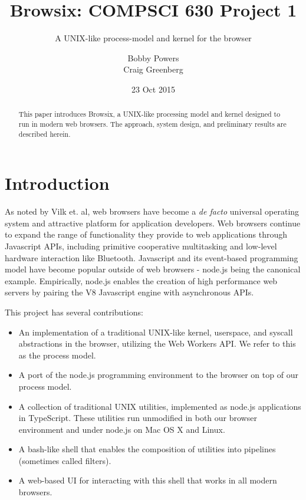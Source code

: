 \documentclass{acm_proc_article-sp}
\begin{document}
\title{Browsix: COMPSCI 630 Project 1}
\subtitle{A UNIX-like process-model and kernel for the browser}

\author{
\alignauthor Bobby Powers\\
\alignauthor Craig Greenberg\\
}
\date{23 Oct 2015}

\maketitle
\begin{abstract}
  This paper introduces Browsix, a UNIX-like processing model and
  kernel designed to run in modern web browsers.  The approach, system
  design, and preliminary results are described herein.
\end{abstract}

\section{Introduction}

As noted by Vilk et. al, web browsers have become a \emph{de facto}
universal operating system and attractive platform for application
developers\cite{vilk:2014doppio}.  Web browsers continue to expand the
range of functionality they provide to web applications through
Javascript APIs, including primitive cooperative
multitasking\cite{mcilroy:2015chrome47} and low-level hardware
interaction like Bluetooth\cite{yasskin:2015webbluetooth}.  Javascript
and its event-based programming model have become popular outside of
web browsers - node.js being the canonical example.  Empirically, node.js
enables the creation of high performance web servers by pairing the V8
Javascript engine with asynchronous APIs.

This project has several contributions:

\begin{itemize}
  \item An implementation of a traditional UNIX-like kernel,
    userspace, and syscall abstractions in the browser, utilizing the
    Web Workers API.  We refer to this as the process model.
  \item A port of the node.js programming environment to the browser
    on top of our process model.
  \item A collection of traditional UNIX utilities, implemented as
    node.js applications in TypeScript.  These utilities run
    unmodified in both our browser environment and under node.js on
    Mac OS X and Linux.
  \item A bash-like shell that enables the composition of utilities
    into pipelines (sometimes called filters).
  \item A web-based UI for interacting with this shell that works in
    all modern browsers.
\end{itemize}
\end{document}

